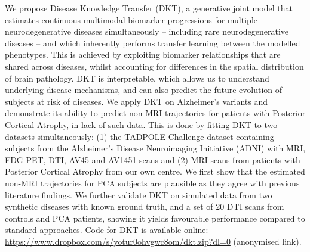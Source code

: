 \documentclass{llncs}
\begin{document}
We propose Disease Knowledge Transfer (DKT), a generative joint model that estimates continuous multimodal biomarker progressions for multiple neurodegenerative diseases simultaneously -- including rare neurodegenerative diseases -- and which inherently performs transfer learning between the modelled phenotypes. This is achieved by exploiting biomarker relationships that are shared across diseases, whilst accounting for differences in the spatial distribution of brain pathology. DKT is interpretable, which allows us to understand underlying disease mechanisms, and can also predict the future evolution of subjects at risk of diseases. We apply DKT on Alzheimer's variants and demonstrate its ability to predict non-MRI trajectories for patients with Posterior Cortical Atrophy, in lack of such data. This is done by fitting DKT to two datasets simultaneously: (1) the TADPOLE Challenge \cite{marinescu2018tadpole} dataset containing subjects from the Alzheimer's Disease Neuroimaging Initiative (ADNI) with MRI, FDG-PET, DTI, AV45 and AV1451 scans and (2) MRI scans from patients with Posterior Cortical Atrophy from our own centre. We first show that the estimated non-MRI trajectories for PCA subjects are plausible as they agree with previous literature findings. We further validate DKT on simulated data from two synthetic diseases with known ground truth, and a set of 20 DTI scans from controls and PCA patients, showing it yields favourable performance compared to standard approaches. Code for DKT is available online: \url{https://www.dropbox.com/s/yotur0ohvgwc8om/dkt.zip?dl=0} (anonymised link).
\end{document}
